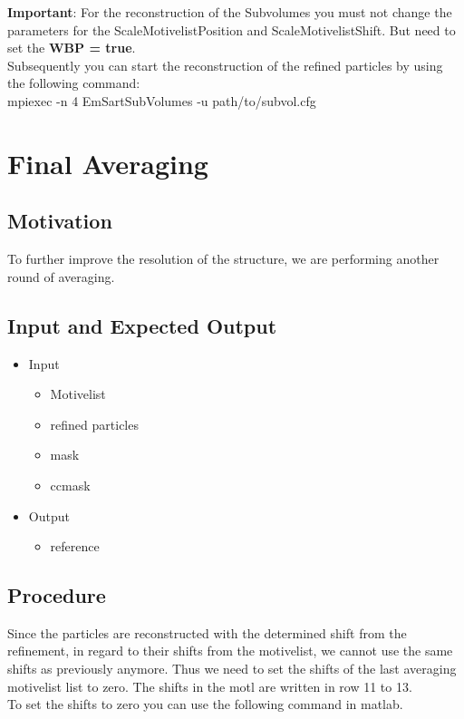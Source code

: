 \documentclass[12pt,a4paper]{scrartcl}
\begin{document}
{\textbf{Important}: For the reconstruction of the Subvolumes you must not change the parameters for the ScaleMotivelistPosition and ScaleMotivelistShift. But need to set the \textbf{WBP = true}.\\    

Subsequently you can start the reconstruction of the refined particles by using the following command:\\ 

mpiexec -n 4 EmSartSubVolumes -u path/to/subvol.cfg

\section{Final Averaging}
\subsection{Motivation}
To further improve the resolution of the structure, we are performing another round of averaging.
\subsection{Input and Expected Output}
\begin{itemize}
	\item Input
	\begin{itemize}
		\item Motivelist  
		\item refined particles 
		\item mask 
		\item ccmask 
	\end{itemize}
	\item Output
	\begin{itemize}
		\item reference
	\end{itemize} 
\end{itemize}
\subsection{Procedure}

Since the particles are reconstructed with the determined shift from the refinement, in regard to their shifts from the motivelist, we cannot use the same shifts as previously anymore.  Thus we need to set the shifts of the last averaging motivelist list to zero. The shifts in the motl are written in row 11 to 13.\\
 
To set the shifts to zero you can use the following command in matlab. \\

}
\end{document}
